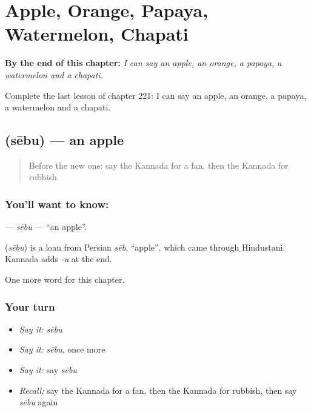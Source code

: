 
\chapter{Apple, Orange, Papaya, Watermelon, Chapati}
\label{ch:ka-apple-orange-papaya-watermelon-chapati}

\begin{chapteropening}
\textbf{By the end of this chapter:} \emph{I can say an apple, an orange, a papaya, a watermelon and a chapati.}

Complete the last lesson of chapter 221: I can say an apple, an orange, a papaya, a watermelon and a chapati.
\end{chapteropening}

\section[\texorpdfstring{\kn{ಸೇಬು} (sēbu)}{ಸೇಬು (sēbu)}]{ (sēbu) — an apple}

\label{lesson:KA-C221-sebu}



\begin{quote}
Before the new one: say the Kannada for a fan, then the Kannada for rubbish.
\end{quote}

\subsection*{You'll want to know: }
\textbf{} — \emph{sēbu} — \textquotedblleft{}an apple\textquotedblright{}.

\begin{cousinweb}
\textbf{} (\emph{sēbu}) is a loan from Persian \emph{sēb}, \textquotedblleft{}apple\textquotedblright{}, which came through Hindustani. Kannada adds \emph{-u} at the end.
\end{cousinweb}

\begin{grammarlens}[title={What you've built}]
One more word for this chapter.
\end{grammarlens}

\subsection*{Your turn}
\begin{itemize}
\raggedright
  \item \emph{Say it:} \emph{sēbu}
  \item \emph{Say it:} \emph{sēbu}, once more
  \item \emph{Say it:} say \emph{sēbu}
  \item \emph{Recall:} say the Kannada for a fan, then the Kannada for rubbish, then say \emph{sēbu} again
\end{itemize}

